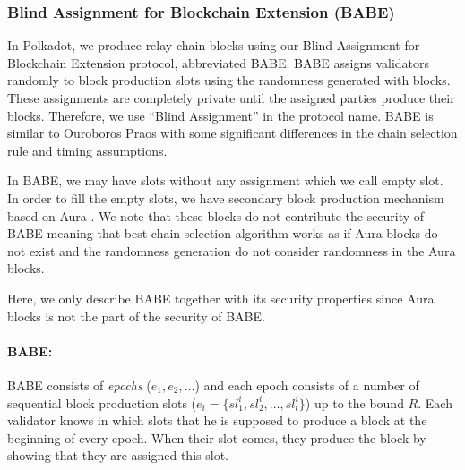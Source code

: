 \subsubsection{Blind Assignment for Blockchain Extension (BABE)}
\label{sec:babe}

In Polkadot, we produce relay chain blocks using our Blind Assignment for Blockchain Extension protocol, abbreviated BABE. BABE assigns validators randomly to block production slots using  the randomness generated with blocks. These assignments are completely private until the assigned parties produce their blocks. Therefore, we use ``Blind Assignment'' in the protocol name. BABE is similar to Ouroboros Praos \cite{Praos} with some significant differences in the chain selection rule and timing assumptions.

In BABE, we may have slots without any assignment which we call empty slot. In order to fill the empty slots, we have secondary block production mechanism based on Aura \cite{aura}. We note that these blocks do not contribute the security of BABE meaning that best chain selection algorithm works as if Aura blocks do not exist and the randomness generation do not consider randomness in the Aura blocks.

Here, we only describe BABE together with its security properties since Aura blocks is not the part of the security of BABE.

\paragraph{BABE:}

BABE \cite{babe} consists of \emph{epochs} ($e_1,e_2,...$) and each epoch consists of a number of sequential block production slots (\(e_i = \{sl^i_{1}, sl^i_{2},\ldots,sl^i_{t}\}\)) up to the bound  $R$.
Each validator knows in which slots that he is supposed to produce a block at the beginning of every epoch. When their slot comes, they produce the block by showing that they are assigned this slot.

